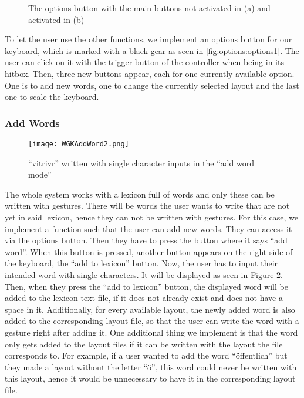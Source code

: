\begin{figure}[H]
    \caption{The options button with the main buttons not activated in (a) and activated in (b)}
    \label{fig:options}
\end{figure}

To let the user use the other functions, we implement an options button for our keyboard, which is marked with a black gear as seen in \cref{fig:options:options1}. The user can click on it with the trigger button of the controller when being in its hitbox. Then, three new buttons appear, each for one currently available option. One is to add new words, one to change the currently selected layout and the last one to scale the keyboard.

\subsubsection{Add Words}
\begin{figure}[H]
    \centering
    \texttt{[image: WGKAddWord2.png]}
    \caption{``vitrivr'' written with single character inputs in the ``add word mode''}
    \label{fig:addword}
\end{figure}
The whole system works with a lexicon full of words and only these can be written with gestures. There will be words the user wants to write that are not yet in said lexicon, hence they can not be written with gestures. For this case, we implement a function such that the user can add new words. They can access it via the options button. Then they have to press the button where it says ``add word''. When this button is pressed, another button appears on the right side of the keyboard, the ``add to lexicon'' button. Now, the user has to input their intended word with single characters. It will be displayed as seen in Figure \ref{fig:addword}. Then, when they press the ``add to lexicon'' button, the displayed word will be added to the lexicon text file, if it does not already exist and does not have a space in it. Additionally, for every available layout, the newly added word is also added to the corresponding layout file, so that the user can write the word with a gesture right after adding it. One additional thing we implement is that the word only gets added to the layout files if it can be written with the layout the file corresponds to. For example, if a user wanted to add the word ``öffentlich'' but they made a layout without the letter ``ö'', this word could never be written with this layout, hence it would be unnecessary to have it in the corresponding layout file.

